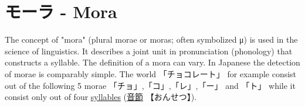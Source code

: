 \section{モーラ - Mora} \label{sec:Mora}

The concept of "mora"  (plural morae or moras; often symbolized μ) is used in
the science of linguistics. It describes a joint unit in pronunciation
(phonology) that constructs a syllable. The definition of a mora can vary.  In
Japanese the detection of morae is comparably simple. The world
{「チョコレート」} for example consist out of the following 5 morae
{「チョ」},{「コ」},{「レ」},{「ー」} and {「ト」} while it consist only out of
four \hyperref[sec:Syllable]{syllables} {(\hyperref[sec:Syllable]{音節}
【おんせつ】)}.

